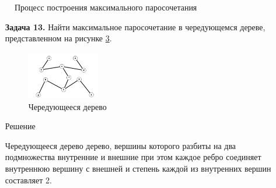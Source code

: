 \documentclass{article}
\begin{document}
\begin{enumerate}
\begin{figure}
\begin{subfigure}[b]{0.37\textwidth}
         \label{fig:12_4}
     \end{subfigure}
     \caption{Процесс построения максимального паросочетания}
    \label{fig:12_max_pairs}
\end{figure}
\end{enumerate}


\clearpage%
\begin{enumerate}
\item[\textbf{Задача 13.}] Найти максимальное паросочетание в чередующемся дереве, представленном на рисунке \ref{fig:13_initree}.
\begin{figure}[ht]
    \includegraphics[width=0.3\textwidth, center]{attachments/13/00.png}
    \caption{Чередующееся дерево}
    \label{fig:13_initree}
\end{figure}
\begin{center}
Решение 
\end{center}
Чередующееся дерево \quad\textemdash\quad дерево, вершины которого разбиты на два подмножества \quad\textemdash\quad внутренние и внешние \quad\textemdash\quad при этом каждое ребро соединяет внутреннюю вершину с внешней и степень каждой из внутренних вершин составляет 2.


\end{enumerate}
\end{document}
